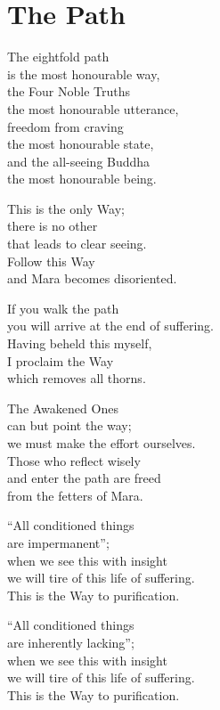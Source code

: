 
\chapter{The Path}


The eightfold path\\
is the most honourable way,\\
the Four Noble Truths\\
the most honourable utterance,\\
freedom from craving\\
the most honourable state,\\
and the all-seeing Buddha\\
the most honourable being.


This is the only Way;\\
there is no other\\
that leads to clear seeing.\\
Follow this Way\\
and Mara becomes disoriented.


If you walk the path\\
you will arrive at the end of suffering.\\
Having beheld this myself,\\
I proclaim the Way\\
which removes all thorns.


The Awakened Ones\\
can but point the way;\\
we must make the effort ourselves.\\
Those who reflect wisely\\
and enter the path are freed\\
from the fetters of Mara.


“All conditioned things\\
are impermanent”;\\
when we see this with insight\\
we will tire of this life of suffering.\\
This is the Way to purification.


“All conditioned things\\
are inherently lacking”;\\
when we see this with insight\\
we will tire of this life of suffering.\\
This is the Way to purification.


